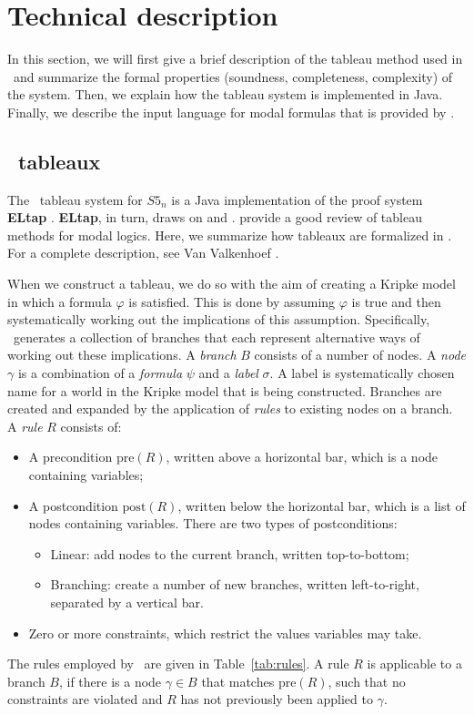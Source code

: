 \section{Technical description}
\label{sec:technical}

In this section, we will first give a brief description of the tableau method
used in \oops\ and summarize the formal properties (soundness, completeness,
complexity) of the system. Then, we explain how the
tableau system is implemented in Java. Finally, we describe the input language
for modal formulas that is provided by \oops.

\subsection{\oops\ tableaux}
\label{sec:}

The \oops\ tableau system for $S5_n$ is a Java \citep{gosling2005}
implementation of the proof system {\bf ELtap} \citep{deboer2007, deboer2006}.  {\bf
ELtap}, in turn, draws on \citet{fitting1999} and \citet{beckert1997}.
\citet{halpern1992} provide a good review of tableau methods for modal logics.
Here, we summarize how tableaux are formalized in \oops. For a complete
description, see Van Valkenhoef \citep{valkenhoef2008}.

When we construct a tableau, we do so with the aim of creating a Kripke model
in which a formula $\varphi$ is satisfied. This is done by assuming $\varphi$
is true and then systematically working out the implications of this
assumption. Specifically, \oops\ generates a collection of branches that each
represent alternative ways of working out these implications. A {\em branch}
$B$ consists of a number of nodes. A {\em node} $\gamma$ is a combination of a
{\em formula} $\psi$ and a {\em label} $\sigma$. A label is systematically
chosen name for a world in the Kripke model that is being constructed. Branches
are created and expanded by the application of {\em rules} to existing nodes on
a branch. A {\em rule} $R$ consists of:

\begin{itemize}
\item A precondition $\mathrm{pre}(R)$, written above a horizontal bar, which
is a node containing variables;
\item A postcondition $\mathrm{post}(R)$, written below the horizontal bar,
which is a list of nodes containing variables. There are two types of
postconditions:
\begin{itemize}
\item Linear: add nodes to the current branch, written top-to-bottom;
\item Branching: create a number of new branches, written left-to-right, separated by a vertical bar.
\end{itemize}
\item Zero or more constraints, which restrict the values variables may take.
\end{itemize}
The rules employed by \oops\ are given in Table~\ref{tab:rules}. A rule $R$ is
applicable to a branch $B$, if there is a node $\gamma \in B$ that matches
$\mathrm{pre}(R)$, such that no constraints are violated and $R$ has not
previously been applied to $\gamma$.

